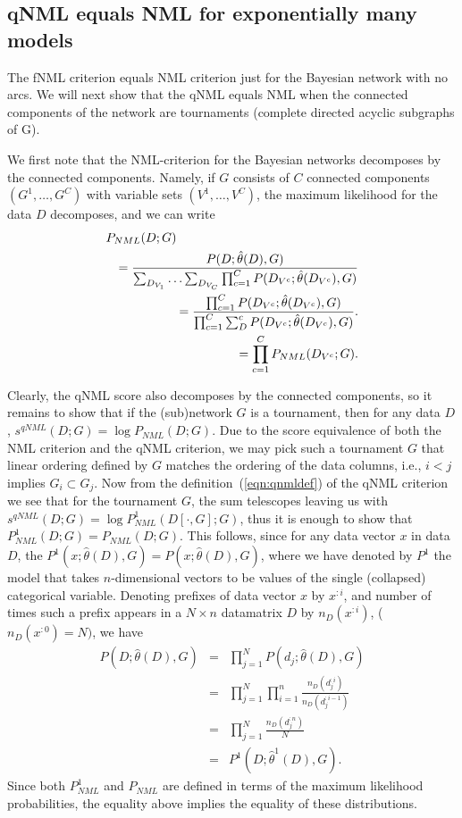 \subsection{qNML equals NML for exponentially many models}
The fNML criterion equals NML criterion just for the Bayesian network
with no arcs.  We will next show that the qNML equals NML when the
connected components of the network are tournaments (complete directed
acyclic subgraphs of G).

We first note that the NML-criterion for the Bayesian networks
decomposes by the connected components. Namely, if $G$ consists of $C$
connected components $(G^1,\ldots,G^C)$ with variable sets $(V^1,\ldots,V^C)$,
the maximum likelihood for the data $D$ decomposes, and we can write
\begin{eqnarray}
  \lefteqn{P_{NML}(D;G)} \nonumber \\
  && = \frac{P(D;\hat\theta(D),G)}
            {\sum_{D_{V_1}}\ldots \sum_{D_{V_C}}\prod_{c=1}^C P(D_{V^c};\hat\theta(D_{V^c}),G)} \nonumber \\
            && = \frac{\prod_{c=1}^C P(D_{V^c};\hat\theta(D_{V^c}),G)} 
            {\prod_{c=1}^C\sum_D^cP(D_{V^c};\hat\theta(D_{V^c}),G)}.\nonumber \\
            && = \prod_{c=1}^CP_{NML}(D_{V^c};G).
\end{eqnarray}

Clearly, the qNML score also decomposes by the connected components,
so it remains to show that if the (sub)network $G$ is a tournament,
then for any data $D$, $s^{qNML}(D;G)=\log P_{NML}(D;G)$.  Due to the
score equivalence of both the NML criterion and the qNML criterion, we
may pick such a tournament $G$ that linear ordering defined by $G$
matches the ordering of the data columns, i.e., $i<j$ implies $G_i
\subset G_j$. Now from the definition~(\ref{eqn:qnmldef}) of the qNML
criterion we see that for the tournament $G$, the sum telescopes
leaving us with $s^{qNML}(D;G) = \log P^1_{NML}(D[\cdot,G];G)$, thus
it is enough to show that $P^1_{NML}(D;G)=P_{NML}(D;G)$.
This follows, since for any data vector $x$ in data $D$, the
$P^1(x;\hat\theta(D),G) = P(x;\hat\theta(D),G)$,
where we have denoted by $P^1$ the model that takes $n$-dimensional
vectors to be values of the single (collapsed) categorical variable.
Denoting prefixes of data vector $x$ by $x^{:i}$, and number of times
such a prefix appears in a $N\times n$ datamatrix $D$ by $n_D(x^{:i})$,
($n_D(x^{:0})=N)$, we have
\begin{eqnarray}
  P(D;\hat\theta(D),G) &=& \prod_{j=1}^{N}P(d_j;\hat\theta(D),G) \nonumber \\
  &=& \prod_{j=1}^{N} \prod_{i=1}^{n} \frac{n_D(d_j^{:i})}{n_D(d_j^{:i-1})} \nonumber\\
  &=& \prod_{j=1}^{N} \frac{n_D(d_j^{:n})}{N} \nonumber \\
  &=& P^1(D;\hat\theta^1(D),G).
\end{eqnarray}
Since both $P^1_{NML}$ and $P_{NML}$ are defined in terms of the
maximum likelihood probabilities, the equality above implies the equality
of these distributions.


